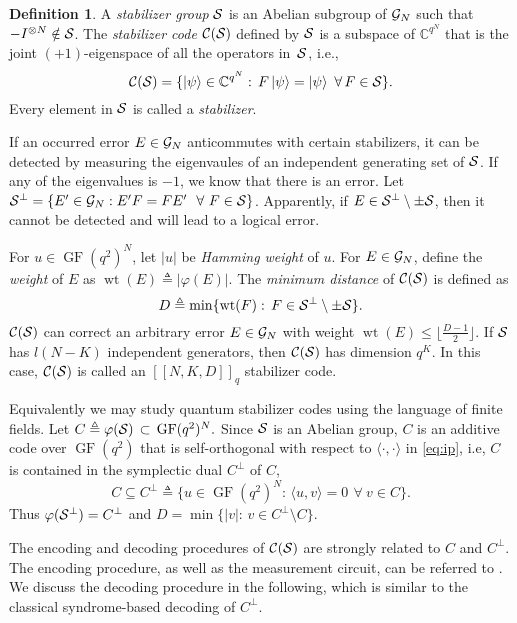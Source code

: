 \documentclass{ieeeaccess}
\DeclareMathOperator{\GF}{GF}
\DeclareMathOperator{\wt}{wt}
\newcommand{\teq}{\triangleq}
\newcommand{\sC}{{\cal C}}
\newcommand{\sG}{{\cal G}}
\newcommand{\sS}{{\cal S}}
\newcommand{\cS}{{\cal S}}
\newcommand{\CC}{{\mathbb C}}
\let\emph\textit
\theoremstyle{definition}		%
\newtheorem{definition}{Definition}
\begin{document}
\begin{definition} \cite{AK01,KKKS06}
	A \emph{stabilizer group} $\sS$ is an Abelian subgroup of $\sG_N$ such that  $-I^{\otimes N} \notin \sS$.
	The \emph{stabilizer code} $\sC(\sS)$ defined by $\sS$ is a subspace of $\CC^{q^N}$ that is the joint \mbox{$(+1)$-eigenspace} of all the operators in~$\sS$, i.e.,
	\begin{equation*}
	\sC(\sS) = \{\ket{\psi} \in \CC^{q^N}:\, F\ket{\psi} = \ket{\psi} ~\forall\, F\in\sS \}.
	\end{equation*}
	Every element in $\sS$ is called a \emph{stabilizer}.
\end{definition}


If an occurred error $E\in\sG_N$ anticommutes with certain stabilizers, it can be detected by measuring the eigenvaules of an independent generating set of $\cS$.
If any of the eigenvalues is $-1$, we know that there is an error. 
%
Let $ \sS^{\perp} = \{E'\in\sG_N: E'F = FE' ~~\forall~ F\in\sS\} $.
Apparently,  if $E\in \cS^\perp\setminus \pm \sS$, then it cannot be detected and will lead to a logical error.

For $u\in\GF(q^2)^N$, let $|u|$ be \emph{Hamming weight} of $u$. 
For $E\in\sG_N$, define the \emph{weight} of $E$ as {$\wt(E) \teq |\varphi(E)|$}.
%
The \emph{minimum distance} of $\sC(\cS)$ is defined as $$D\teq \min\{\wt(F):\, F \in  { \cS^\perp \setminus \pm\cS }  \}.$$ 
	$\sC(\sS)$ can correct an arbitrary error $E\in\sG_N$ with weight $\wt(E) \le \lfloor\frac{D-1}{2}\rfloor$.
	If $\sS$ has $l(N-K)$ independent generators, then $\sC(\sS)$ has dimension $q^{K}$.
In this case, $\sC(\sS)$ is called an $[[N,K,D]]_q$ stabilizer code.



Equivalently we may study quantum stabilizer codes using the language of finite fields. 
Let $C \triangleq\varphi(\sS) \,\subset\, \GF(q^2)^N.$ %
Since $\sS$ is an Abelian group, $C$ is an additive code over $\GF(q^2)$ that is self-orthogonal with respect to $\langle\cdot,\cdot\rangle$ in \eqref{eq:ip}, i.e,
$C$ is contained in the symplectic dual $C^\perp$ of $C$,
\begin{equation*}
C \subseteq C^\perp \teq \{u\in \GF(q^2)^N :\, \langle u, v \rangle = 0\, ~\forall~ v\in C \}.
\end{equation*}
%
Thus $\varphi(\sS^\perp) = C^\perp$ and 
	$
	D = \min\{ |v| :\, v\in C^\perp \setminus C\}.
	$

The encoding and decoding procedures of $\sC(\sS)$ are strongly related to $C$ and $C^\perp$. 
The encoding procedure,  {as well as the measurement circuit,} can be referred to \cite{NC00,GRB03}.
We discuss the decoding procedure in the following, which is similar to the classical syndrome-based decoding of $C^\perp$.
\end{document}
